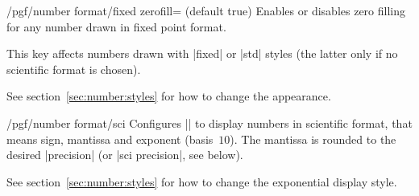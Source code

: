 \begin{key}{/pgf/number format/fixed zerofill=  (default true)}
  Enables or disables zero filling for any number drawn in fixed point
  format. 

\begin{codeexample}[]
\hspace{1em}
\hspace{1em}
\hspace{1em}
\hspace{1em}
\end{codeexample}
  This key affects numbers drawn with |fixed| or |std| styles (the
  latter only if no scientific format is chosen). 
\begin{codeexample}[]
\hspace{1em}
\hspace{1em}
\hspace{1em}
\end{codeexample}

  See section~\ref{sec:number:styles} for how to change the
  appearance. 
\end{key}

\begin{key}{/pgf/number format/sci}
  Configures |\pgfmathprintnumber| to display numbers in scientific
  format, that means sign, mantissa and exponent (basis~$10$). The
  mantissa is rounded to the desired |precision| (or |sci precision|,
  see below). 

\begin{codeexample}[]
\hspace{1em}
\hspace{1em}
\hspace{1em}
\hspace{1em}
\end{codeexample}

See section~\ref{sec:number:styles} for how to change the exponential
display style. 
\end{key}

